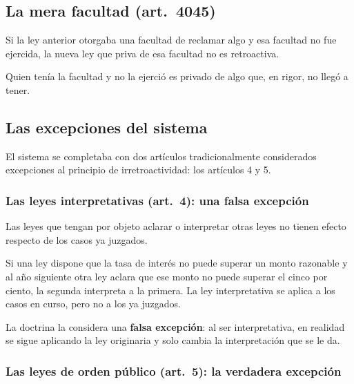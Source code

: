 \documentclass[12pt,oneside]{book}
\begin{document}
\subsection{La mera facultad (art.~4045)}

\begin{regla}
Si la ley anterior otorgaba una facultad de reclamar algo y esa facultad no fue ejercida, la nueva ley que priva de esa facultad no es retroactiva.
\end{regla}

Quien tenía la facultad y no la ejerció es privado de algo que, en rigor, no llegó a tener.

\subsection{Las excepciones del sistema}

El sistema se completaba con dos artículos tradicionalmente considerados excepciones al principio de irretroactividad: los artículos 4 y 5.

\subsubsection{Las leyes interpretativas (art.~4): una falsa excepción}

\begin{regla}
Las leyes que tengan por objeto aclarar o interpretar otras leyes no tienen efecto respecto de los casos ya juzgados.
\end{regla}

\begin{ejemplo}
Si una ley dispone que la tasa de interés no puede superar un monto razonable y al año siguiente otra ley aclara que ese monto no puede superar el cinco por ciento, la segunda interpreta a la primera. La ley interpretativa se aplica a los casos en curso, pero no a los ya juzgados.
\end{ejemplo}

La doctrina la considera una \textbf{falsa excepción}: al ser interpretativa, en realidad se sigue aplicando la ley originaria y solo cambia la interpretación que se le da.

\subsubsection{Las leyes de orden público (art.~5): la verdadera excepción}
\end{document}
